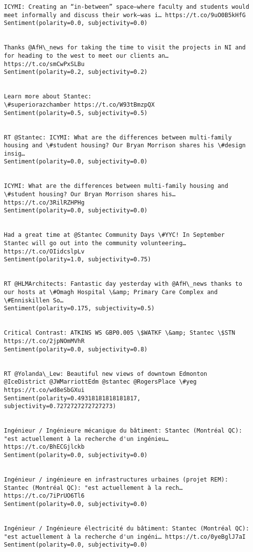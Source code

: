 \documentclass[11pt]{article}
\begin{document}
\begin{Verbatim}[commandchars=\\\{\}]
ICYMI: Creating an “in-between” space—where faculty and students would meet informally and discuss their work—was i… https://t.co/9uO0B5kHfG
Sentiment(polarity=0.0, subjectivity=0.0)


Thanks @AfH\_news for taking the time to visit the projects in NI and for heading to the west to meet our clients an… https://t.co/smCwPxSLBu
Sentiment(polarity=0.2, subjectivity=0.2)


Learn more about Stantec:
\#superiorazchamber https://t.co/W93tBmzpQX
Sentiment(polarity=0.5, subjectivity=0.5)


RT @Stantec: ICYMI: What are the differences between multi-family housing and \#student housing? Our Bryan Morrison shares his \#design insig…
Sentiment(polarity=0.0, subjectivity=0.0)


ICYMI: What are the differences between multi-family housing and \#student housing? Our Bryan Morrison shares his… https://t.co/3RilRZHPHg
Sentiment(polarity=0.0, subjectivity=0.0)


Had a great time at @Stantec Community Days \#YYC! In September Stantec will go out into the community volunteering… https://t.co/OIidcslpLv
Sentiment(polarity=1.0, subjectivity=0.75)


RT @HLMArchitects: Fantastic day yesterday with @AfH\_news thanks to our hosts at \#Omagh Hospital \&amp; Primary Care Complex and \#Enniskillen So…
Sentiment(polarity=0.175, subjectivity=0.5)


Critical Contrast: ATKINS WS GBP0.005 \$WATKF \&amp; Stantec \$STN https://t.co/2jpNOmMVhR
Sentiment(polarity=0.0, subjectivity=0.8)


RT @Yolanda\_Lew: Beautiful new views of downtown Edmonton @IceDistrict @JWMarriottEdm @stantec @RogersPlace \#yeg https://t.co/wd8eSbGXui
Sentiment(polarity=0.49318181818181817, subjectivity=0.7272727272727273)


Ingénieur / Ingénieure mécanique du bâtiment: Stantec (Montréal QC): "est actuellement à la recherche d'un ingénieu… https://t.co/BhECGjlckb
Sentiment(polarity=0.0, subjectivity=0.0)


Ingénieur / ingénieure en infrastructures urbaines (projet REM): Stantec (Montréal QC): "est actuellement à la rech… https://t.co/7iPrUO6Tl6
Sentiment(polarity=0.0, subjectivity=0.0)


Ingénieur / Ingénieure électricité du bâtiment: Stantec (Montréal QC): "est actuellement à la recherche d'un ingéni… https://t.co/0yeBglJ7aI
Sentiment(polarity=0.0, subjectivity=0.0)



\end{Verbatim}
\end{document}
